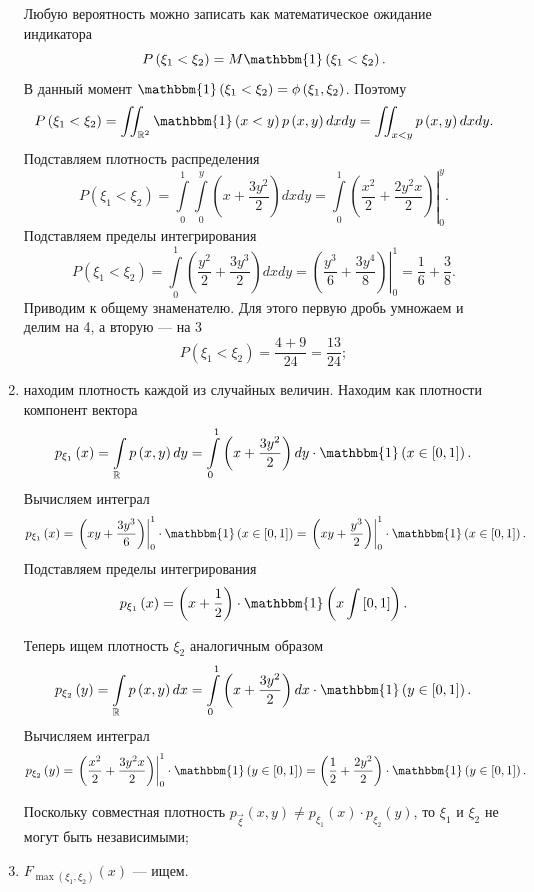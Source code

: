 \begin{enumerate}[label=\alph*)]
Любую вероятность можно записать как математическое ожидание индикатора
$$P \left( \xi_1 < \xi_2 \right) =
M \mathbbm{1} \left( \xi_1 < \xi_2 \right).$$
В данный момент $\mathbbm{1} \left( \xi_1 < \xi_2 \right) = \phi \left( \xi_1, \xi_2 \right) $.
Поэтому
$$P \left( \xi_1 < \xi_2 \right) =
\iint_{ \mathbb{R}^2} \mathbbm{1} \left( x < y \right) p \left( x, y \right) dxdy =
\iint_{x < y} p \left( x, y \right) dxdy.$$
Подставляем плотность распределения
$$P \left( \xi_1 < \xi_2 \right) =
\int \limits_0^1 \int \limits_0^y \left( x + \frac{3y^2}{2} \right) dxdy =
\left. \int \limits_0^1 \left( \frac{x^2}{2} + \frac{2y^2 x}{2} \right) \right|_0^y.$$
Подставляем пределы интегрирования
$$P \left( \xi_1 < \xi_2 \right) =
\int \limits_0^1 \left( \frac{y^2}{2} + \frac{3y^3}{2} \right) dxdy =
\left. \left( \frac{y^3}{6} + \frac{3y^4}{8} \right) \right|_0^1 =
\frac{1}{6} + \frac{3}{8}.$$
Приводим к общему знаменателю.
Для этого первую дробь умножаем и делим на 4, а вторую --- на 3
$$P \left( \xi_1 < \xi_2 \right) =
\frac{4+9}{24} =
\frac{13}{24};$$
\item находим плотность каждой из случайных величин.
Находим как плотности компонент вектора
$$p_{ \xi_1} \left( x \right) =
\int \limits_{ \mathbb{R}} p \left( x, y \right) dy =
\int \limits_0^1 \left( x + \frac{3y^2}{2} \right) dy \cdot \mathbbm{1} \left( x \in \left[ 0, 1 \right] \right).$$
Вычисляем интеграл
$$p_{ \xi_1} \left( x \right) =
\left. \left( xy + \frac{3y^3}{6} \right) \right|_0^1 \cdot \mathbbm{1} \left( x \in \left[ 0, 1 \right] \right) =
\left. \left( xy + \frac{y^3}{2} \right) \right|_0^1 \cdot \mathbbm{1} \left( x \in \left[ 0, 1 \right] \right).$$
Подставляем пределы интегрирования
$$p_{ \xi_1} \left( x \right) =
\left( x + \frac{1}{2} \right) \cdot \mathbbm{1} \left( x \int \left[ 0, 1 \right] \right).$$

Теперь ищем плотность $ \xi_2$ аналогичным образом
$$p_{ \xi_2} \left( y \right) =
\int \limits_{ \mathbb{R}} p \left( x, y \right) dx =
\int \limits_0^1 \left( x + \frac{3y^2}{2} \right) dx \cdot \mathbbm{1} \left( y \in \left[ 0, 1 \right] \right).$$
Вычисляем интеграл
$$p_{ \xi_2} \left( y \right) =
\left. \left( \frac{x^2}{2} + \frac{3y^2 x}{2} \right) \right|_0^1 \cdot \mathbbm{1} \left( y \in \left[ 0, 1 \right] \right) =
\left( \frac{1}{2} + \frac{2y^2}{2} \right) \cdot \mathbbm{1} \left( y \in \left[ 0, 1 \right] \right).$$

Поскольку совместная плотность $p_{ \vec{ \xi }} \left( x, y \right) \neq p_{ \xi_1} \left( x \right) \cdot p_{ \xi_2} \left( y \right) $,
то $ \xi_1$ и $ \xi_2$ не могут быть независимыми;
\item $F_{ \max \left( \xi_1, \xi_2 \right) } \left( x \right) $ --- ищем.


\end{enumerate}
